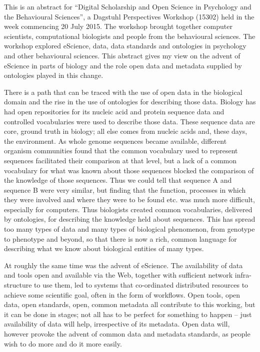 \documentclass[a4paper,USenglish]{dagrep}
\begin{document}
{}
\license

This is an abstract for ``Digital Scholarship and Open Science in Psychology and
the Behavioural Sciences'', a Dagstuhl Perspectives Workshop (15302) held in the
week commencing 20 July 2015. The workshop brought together computer scientists,
computational biologists and people from the behavioural sciences. The workshop
explored eScience, data, data standards and ontologies in psychology and other
behavioural sciences. This abstract gives my view on the advent of eScience in
parts of biology and the role open data and metadata supplied by ontologies
played in this change.

There is a path that can be traced with the use of open data in the biological
domain and the rise in the use of ontologies for describing those data. Biology
has had open repositories for its nucleic acid and protein sequence data and
controlled vocabularies were used to describe those data. These sequence data
are core, ground truth in biology; all else comes from nucleic acids and, these
days, the environment. As whole genome sequences became available, different
organism communities found that the common vocabulary used to represent
sequences facilitated their comparison at that level, but a lack of a common
vocabulary for what was known about those sequences blocked the comparison of
the knowledge of those sequences. Thus we could tell that sequence A and
sequence B were very similar, but finding that the function, processes in which
they were involved and where they were to be found etc. was much more difficult,
especially for computers. Thus biologists created common vocabularies, delivered
by ontologies, for describing the knowledge held about sequences. This has
spread too many types of data and many types of biological phenomenon, from
genotype to phenotype and beyond, so that there is now a rich, common language
for describing what we know about biological entities of many types.

At roughly the same time was the advent of eScience. The availability of data
and tools open and available via the Web, together with sufficient network
infra-structure to use them, led to systems that co-ordinated distributed
resources to achieve some scientific goal, often in the form of workflows.  Open
tools, open data, open standards, open, common metadata all contribute to this
working, but it can be done in  stages; not all has to be perfect for something
to happen – just availability of data will help, irrespective of its metadata.
Open data will, however provoke the advent of common data and metadata
standards, as people wish to do more and do it more easily.
\end{document}
